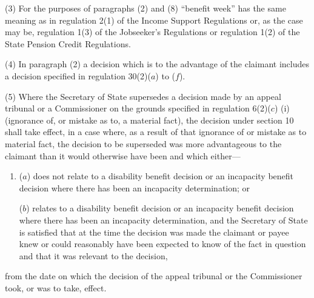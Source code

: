 \documentclass[12pt,a4paper]{article}
\begin{document}
(3) For the purposes of paragraphs (2) and (8) “benefit week” has the same meaning as in regulation 2(1) of the Income Support Regulations or, as the case may be, regulation 1(3) of the Jobseeker’s Regulations
or regulation 1(2) of the State Pension Credit Regulations.  %

(4) In paragraph (2) a decision which is to the advantage of the claimant includes a decision specified in regulation 30(2)($a$) to ($f$).

%

(5) Where the Secretary of State supersedes a decision made by an appeal tribunal or a Commissioner on the grounds specified in regulation 6(2)($c$)%
(i)  %
(ignorance of, or mistake as to, a material fact), the decision under section 10 shall take effect, in a case where, as a result of that ignorance of or mistake as to material fact, the decision to be superseded was more advantageous to the claimant than it would otherwise have been and which either—
\begin{enumerate}\item[]
($a$) does not relate to a disability benefit decision or an incapacity benefit decision where there has been an incapacity determination; or

($b$) relates to a disability benefit decision or an incapacity benefit decision where there has been an incapacity determination, and the Secretary of State is satisfied that at the time the decision was made the claimant or payee knew or could reasonably have been expected to know of the fact in question and that it was relevant to the decision,
\end{enumerate}
from the date on which the decision of the appeal tribunal or the Commissioner took, or was to take, effect.
\end{document}
